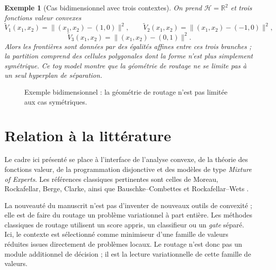 \documentclass[11pt,a4paper]{article}
\newtheorem{example}{Exemple}[section]
\newcommand{\R}{\mathbb R}
\newcommand{\Hh}{\mathcal H}
\newcommand{\Bcal}{\mathcal B}
\begin{document}
\begin{example}[Cas bidimensionnel avec trois contextes]
On prend \(\Hh=\R^2\) et trois fonctions valeur convexes
\[
\widetilde V_1(x_1,x_2)=\|(x_1,x_2)-(1,0)\|^2,
\qquad
\widetilde V_2(x_1,x_2)=\|(x_1,x_2)-(-1,0)\|^2,
\]
\[
\widetilde V_3(x_1,x_2)=\|(x_1,x_2)-(0,1)\|^2.
\]
Alors les frontières sont données par des égalités affines entre ces trois branches ; la partition comprend des cellules polygonales dont la forme n'est plus simplement symétrique. Ce toy model montre que la géométrie de routage ne se limite pas à un seul hyperplan de séparation.
\end{example}

\begin{figure}[ht]
\centering
{}
\caption{Exemple bidimensionnel : la géométrie de routage n'est pas limitée aux cas symétriques.}
\end{figure}

\section{Relation à la littérature}

Le cadre ici présenté se place à l'interface de l'analyse convexe, de la théorie des fonctions valeur, de la programmation disjonctive et des modèles de type \emph{Mixture of Experts}. Les références classiques pertinentes sont celles de Moreau, Rockafellar, Berge, Clarke, ainsi que Bauschke--Combettes et Rockafellar--Wets \cite{Moreau1965,Rockafellar1970,Berge1963,Clarke1983,BauschkeCombettes2017,RockafellarWets1998}.

La nouveauté du manuscrit n'est pas d'inventer de nouveaux outils de convexité ; elle est de faire du routage un problème variationnel à part entière. Les méthodes classiques de routage utilisent un score appris, un classifieur ou un \emph{gate} séparé. Ici, le contexte est sélectionné comme minimiseur d'une famille de valeurs réduites issues directement de problèmes locaux. Le routage n'est donc pas un module additionnel de décision ; il est la lecture variationnelle de cette famille de valeurs.
\end{document}
